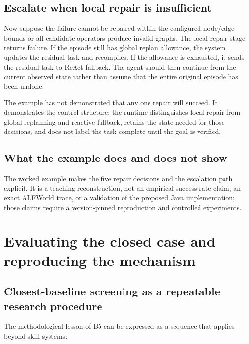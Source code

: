 \subsection{Escalate when local repair is insufficient}

Now suppose the failure cannot be repaired within the configured node/edge bounds or all candidate operators produce invalid graphs. The local repair stage returns failure. If the episode still has global replan allowance, the system updates the residual task and recompiles. If the allowance is exhausted, it sends the residual task to ReAct fallback. The agent should then continue from the current observed state rather than assume that the entire original episode has been undone.

The example has not demonstrated that any one repair will succeed. It demonstrates the control structure: the runtime distinguishes local repair from global replanning and reactive fallback, retains the state needed for those decisions, and does not label the task complete until the goal is verified.

\subsection{What the example does and does not show}

The worked example makes the five repair decisions and the escalation path explicit. It is a teaching reconstruction, not an empirical success-rate claim, an exact ALFWorld trace, or a validation of the proposed Java implementation; those claims require a version-pinned reproduction and controlled experiments.

\section{Evaluating the closed case and reproducing the mechanism}
\label{sec:ch17-evaluation-method}

\subsection{Closest-baseline screening as a repeatable research procedure}

The methodological lesson of B5 can be expressed as a sequence that applies beyond skill systems:

